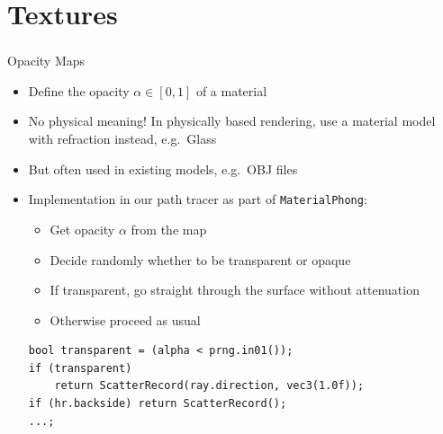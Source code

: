 \documentclass[utf8,stillsansserifmath,fleqn,t]{beamer}
\newcommand{\code}[1]{\texttt{#1}}
\begin{document}
\section{Textures}

\begin{frame}[fragile,label=opacity-maps-1]
\frametitle{\insertsection}
Opacity Maps
\begin{itemize}
\item Define the opacity $\alpha \in [0,1]$ of a material
\item No physical meaning! In physically based rendering, use a material model
with refraction instead, e.g.~Glass
\item But often used in existing models, e.g.~OBJ files
\item Implementation in our path tracer as part of \code{MaterialPhong}:
    \begin{itemize}
    \item Get opacity $\alpha$ from the map
    \item Decide randomly whether to be transparent or opaque
    \item If transparent, go straight through the surface without attenuation
    \item Otherwise proceed as usual
    \end{itemize}
\begin{lstlisting}
bool transparent = (alpha < prng.in01());
if (transparent)
    return ScatterRecord(ray.direction, vec3(1.0f));
if (hr.backside) return ScatterRecord();
...;
\end{lstlisting}    
\end{itemize}
\end{frame}
\end{document}
